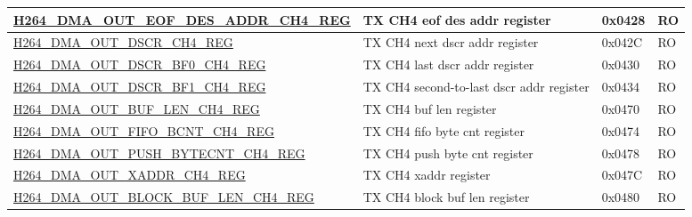 \begin{longtable}{ | p{7.5cm} | p{5.7cm} | p{1.2cm} | p{1.5cm} | }
\hyperref[regdesc:H264DMAOUTEOFDESADDRCH4REG]{H264\_DMA\_OUT\_EOF\_DES\_ADDR\_CH4\_REG} & TX CH4 eof des addr register & 0x0428 & RO \\ \hline
\hyperref[regdesc:H264DMAOUTDSCRCH4REG]{H264\_DMA\_OUT\_DSCR\_CH4\_REG} & TX CH4 next dscr addr register & 0x042C & RO \\ \hline
\hyperref[regdesc:H264DMAOUTDSCRBF0CH4REG]{H264\_DMA\_OUT\_DSCR\_BF0\_CH4\_REG} & TX CH4 last dscr addr register & 0x0430 & RO \\ \hline
\hyperref[regdesc:H264DMAOUTDSCRBF1CH4REG]{H264\_DMA\_OUT\_DSCR\_BF1\_CH4\_REG} & TX CH4 second-to-last dscr addr register & 0x0434 & RO \\ \hline
\hyperref[regdesc:H264DMAOUTBUFLENCH4REG]{H264\_DMA\_OUT\_BUF\_LEN\_CH4\_REG} & TX CH4 buf len register & 0x0470 & RO \\ \hline
\hyperref[regdesc:H264DMAOUTFIFOBCNTCH4REG]{H264\_DMA\_OUT\_FIFO\_BCNT\_CH4\_REG} & TX CH4 fifo byte cnt register & 0x0474 & RO \\ \hline
\hyperref[regdesc:H264DMAOUTPUSHBYTECNTCH4REG]{H264\_DMA\_OUT\_PUSH\_BYTECNT\_CH4\_REG} & TX CH4 push byte cnt register & 0x0478 & RO \\ \hline
\hyperref[regdesc:H264DMAOUTXADDRCH4REG]{H264\_DMA\_OUT\_XADDR\_CH4\_REG} & TX CH4 xaddr register & 0x047C & RO \\ \hline
\hyperref[regdesc:H264DMAOUTBLOCKBUFLENCH4REG]{H264\_DMA\_OUT\_BLOCK\_BUF\_LEN\_CH4\_REG} & TX CH4 block buf len register & 0x0480 & RO \\ \hline


\end{longtable}
